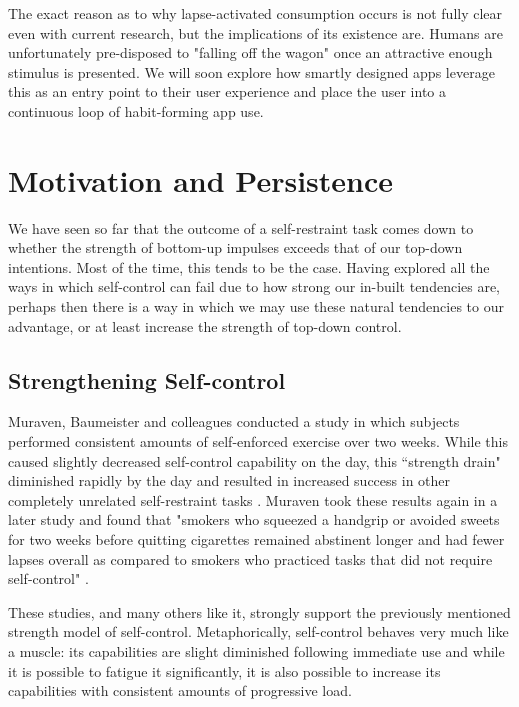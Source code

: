 The exact reason as to why lapse-activated consumption occurs is not fully clear even with current research, but the implications of its existence are. Humans are unfortunately pre-disposed to "falling off the wagon" once an attractive enough stimulus is presented. We will soon explore how smartly designed apps leverage this as an entry point to their user experience and place the user into a continuous loop of habit-forming app use.

\section{Motivation and Persistence}
We have seen so far that the outcome of a self-restraint task comes down to whether the strength of bottom-up impulses exceeds that of our top-down intentions. Most of the time, this tends to be the case. Having explored all the ways in which self-control can fail due to how strong our in-built tendencies are, perhaps then there is a way in which we may use these natural tendencies to our advantage, or at least increase the strength of top-down control.

\subsection{Strengthening Self-control}
Muraven, Baumeister and colleagues conducted a study in which subjects performed consistent amounts of self-enforced exercise over two weeks. While this caused slightly decreased self-control capability on the day, this ``strength drain" diminished rapidly by the day and resulted in increased success in other completely unrelated self-restraint tasks \cite{muraven1999longitudinal}. Muraven took these results again in a later study and found that "smokers who squeezed a handgrip or avoided sweets for two weeks before quitting cigarettes remained abstinent longer and had fewer lapses overall as compared to smokers who practiced tasks that did not require self-control" \cite{muraven2010practicing}.

These studies, and many others like it, strongly support the previously mentioned strength model of self-control. Metaphorically, self-control behaves very much like a muscle: its capabilities are slight diminished following immediate use and while it is possible to fatigue it significantly, it is also possible to increase its capabilities with consistent amounts of progressive load.

